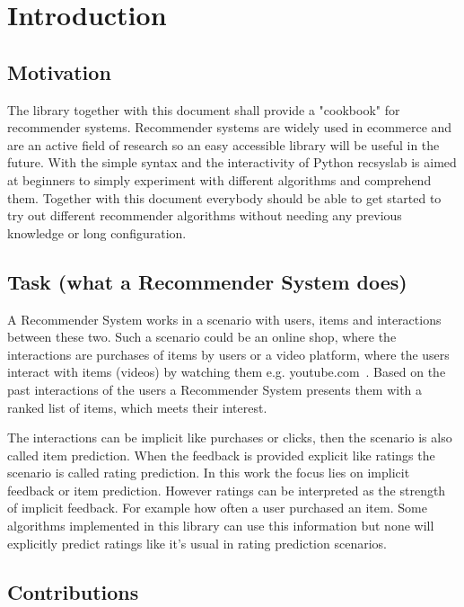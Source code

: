 \chapter{Introduction}


\section{Motivation}

The library together with this document shall provide a "cookbook"
for recommender systems. Recommender systems are widely used in ecommerce
and are an active field of research so an easy accessible library will be 
useful in the future.
With the simple syntax and the interactivity
of Python recsyslab is aimed at beginners to simply experiment with different
algorithms and comprehend them. Together with this document everybody
should be able to get started to try out different recommender algorithms
without needing any previous knowledge or long configuration.


\section{Task (what a Recommender System does)}

A Recommender System works in a scenario with users, items and interactions
between these two. Such a scenario could be an online shop,
where the interactions are purchases of items by users or a video
platform, where the users interact with items (videos) by watching
them e.g. youtube.com~\cite{youtube}. Based on the past interactions of the users
a Recommender System presents them with a ranked list of items, which meets their interest.

The interactions can be implicit like purchases or clicks, then the
scenario is also called item prediction. When the feedback is provided
explicit like ratings the scenario is called rating prediction. In
this work the focus lies on implicit feedback or item prediction.
However ratings can be interpreted as the strength of implicit feedback.
For example how often a user purchased an item. Some algorithms implemented
in this library can use this information but none will explicitly
predict ratings like it's usual in rating prediction scenarios.


\section{Contributions}

